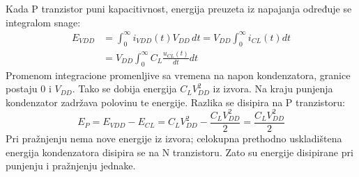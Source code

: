 Kada P tranzistor puni kapacitivnost, energija preuzeta iz napajanja određuje se integralom snage:
\[\begin{aligned}E_{VDD}&=\int_0^\infty i_{VDD}(t)V_{DD}\,dt=V_{DD}\int_0^\infty i_{CL}(t)dt\\&=V_{DD}\int_0^\infty C_L\frac{u_{CL}(t)}{dt}dt\end{aligned}\]
Promenom integracione promenljive sa vremena na napon kondenzatora, granice postaju 0 i $V_{DD}$. Tako se dobija energija $C_LV_{DD}^2$ iz izvora. Na kraju punjenja kondenzator zadržava polovinu te energije. Razlika se disipira na P tranzistoru:
\[E_P=E_{VDD}-E_{CL}=C_LV_{DD}^2-\frac{C_LV_{DD}^2}2=\frac{C_LV_{DD}^2}2\]
Pri pražnjenju nema nove energije iz izvora; celokupna prethodno uskladištena energija kondenzatora disipira se na N tranzistoru. Zato su energije disipirane pri punjenju i pražnjenju jednake.
